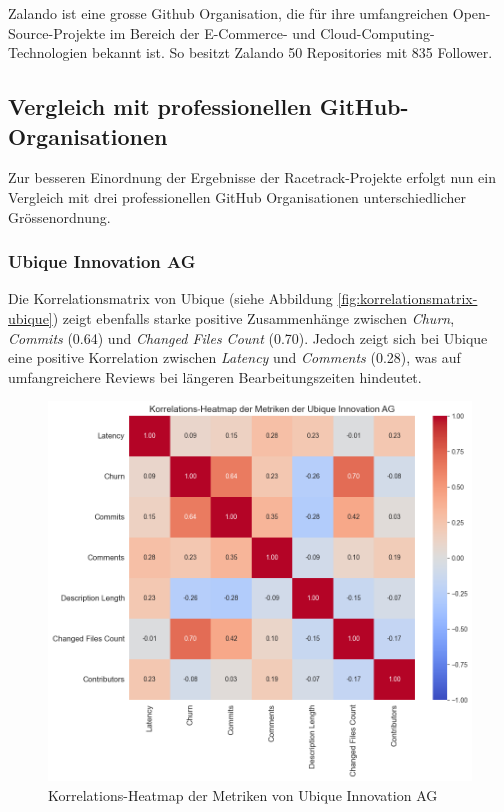 Zalando ist eine grosse Github Organisation, die für ihre umfangreichen Open-Source-Projekte im Bereich der E-Commerce- und Cloud-Computing-Technologien bekannt ist. So besitzt Zalando 50 Repositories mit 835 Follower. \parencite{noauthor_zalando_nodate}


\subsection{Vergleich mit professionellen GitHub-Organisationen}
Zur besseren Einordnung der Ergebnisse der Racetrack-Projekte erfolgt nun ein Vergleich mit drei professionellen GitHub Organisationen unterschiedlicher Grössenordnung.


\subsubsection{Ubique Innovation AG}
Die Korrelationsmatrix von Ubique (siehe Abbildung \autoref{fig:korrelationsmatrix-ubique}) zeigt ebenfalls starke positive Zusammenhänge zwischen \textit{Churn}, \textit{Commits} (0.64) und \textit{Changed Files Count} (0.70). Jedoch zeigt sich bei Ubique eine positive Korrelation zwischen \textit{Latency} und \textit{Comments} (0.28), was auf umfangreichere Reviews bei längeren Bearbeitungszeiten hindeutet.

\begin{figure}[htbp]
\includegraphics[width=\textwidth]{Figures/ubique-korrelationsmatrix.png}
\caption{Korrelations-Heatmap der Metriken von Ubique Innovation AG}
\label{fig:korrelationsmatrix-ubique}
\end{figure}


